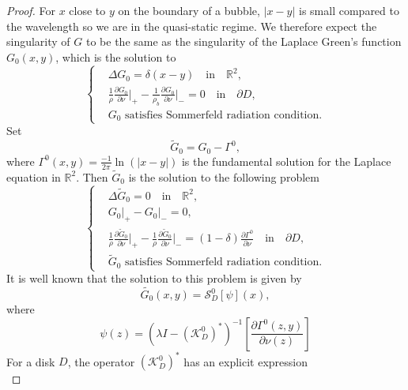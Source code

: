 \documentclass[a4paper]{article}
\theoremstyle{definition}
\newcommand{\R}{\mathbb{R}}
\renewcommand{\S}{\mathcal{S}}
\newcommand{\K}{\mathcal{K}}
\newcommand{\ds}{\displaystyle}
\begin{document}
\begin{proof}
For $x$ close to $y$ on the boundary of a bubble, $|x-y|$ is small compared to the wavelength so we are in the quasi-static regime. We therefore expect the singularity of $G$ to be the same as the singularity of the Laplace Green's function $G_0(x,y)$, which is the solution to 
\begin{equation*}
\left\{
\begin{array}{ll}
	&\ds \Delta G_0 = \delta(x-y) \quad \text{in}\quad \R^2, \\
	&\ds \frac{1}{\rho}\frac{\partial G_0}{\partial \nu}\bigg|_+ - \frac{1}{\rho_b}\frac{\partial G_0}{\partial \nu}\bigg|_- = 0 \quad \text{in} \quad \partial D, \\
	&\ds G_0 \text{ satisfies Sommerfeld radiation condition.} 
\end{array}
\right.	
\end{equation*}
Set \begin{equation}\label{eq:gtilde}
\tilde{G}_0 = G_0-\Gamma^0,
\end{equation}
where $\Gamma^0(x,y)= \frac{-1}{2\pi}\ln(|x-y|)$ is the fundamental solution for the Laplace equation in $\R^2$. Then $\tilde{G}_0$ is the solution to the following problem
\begin{equation*}
\left\{
\begin{array}{ll}
&\ds \Delta \tilde{G}_0 = 0 \quad \text{in}\quad \R^2, \\
&\ds G_0\big|_+-G_0\big|_- = 0, \\
&\ds \frac{1}{\rho}\frac{\partial \tilde{G}_0}{\partial \nu}\bigg|_+ - \frac{1}{\rho}\frac{\partial \tilde{G}_0}{\partial \nu}\bigg|_- = (1-\delta)\frac{\partial \Gamma^0}{\partial \nu} \quad \text{in} \quad \partial D, \\
&\ds \tilde{G}_0 \text{ satisfies Sommerfeld radiation condition.} 
\end{array}
\right.	
\end{equation*}
It is well known that the solution to this problem is given by
\begin{equation*}
\tilde{G_0}(x,y) = \S_D^0 \left[\psi\right](x),
\end{equation*}
where
\begin{equation*}
\psi(z) = \left(\lambda I - \left( \K_D^0 \right)^*\right)^{-1} \left[ \frac{\partial\Gamma^0(z,y)}{\partial \nu(z)} \right] 
\end{equation*}
For a disk $D$, the operator $\left(\K_D^0\right)^*$ has an explicit expression
\begin{equation*}

\end{equation*}
\end{proof}
\end{document}

